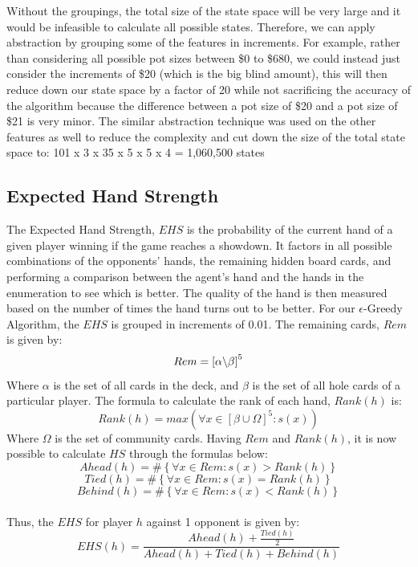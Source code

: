 \documentclass{article}
\begin{document}
Without the groupings, the total size of the state space will be very large and it would be infeasible to calculate all possible states. Therefore, we can apply abstraction by grouping some of the features in increments. For example, rather than considering all possible pot sizes between \$0 to \$680, we could instead just consider the increments of \$20 (which is the big blind amount), this will then reduce down our state space by a factor of 20 while not sacrificing the accuracy of the algorithm because the difference between a pot size of \$20 and a pot size of \$21 is very minor. The similar abstraction technique was used on the other features as well to reduce the complexity and cut down the size of the total state space to: 101 x 3 x 35 x 5 x 5 x 4 = 1,060,500 states

\subsection{Expected Hand Strength}

The Expected Hand Strength, $EHS$ is the probability of the current hand of a given player winning if the game reaches a showdown. It factors in all possible combinations of the opponents' hands, the remaining hidden board cards, and performing a comparison between the agent's hand and the hands in the enumeration to see which is better. The quality of the hand is then measured based on the number of times the hand turns out to be better. For our $\epsilon$-Greedy Algorithm, the $EHS$ is grouped in increments of 0.01. The remaining cards, $Rem$ is given by:
\begin{displaymath}
  Rem = \left[ \alpha \char`\\ \beta \right]^{5}
\end{displaymath}
Where $\alpha$ is the set of all cards in the deck, and $\beta$ is the set of all hole cards of a particular player. The formula to calculate the rank of each hand, $Rank(h)$ is:
\begin{displaymath}
  Rank(h) = max({\forall x \in [\beta \cup \Omega]^{5} : s(x)})
\end{displaymath}
Where $\Omega$ is the set of community cards.
Having $Rem$ and $Rank(h)$, it is now possible to calculate $HS$ through the formulas below:
\begin{displaymath}
  Ahead(h) = \# \left\lbrace \forall x \in Rem:s(x) > Rank(h) \right\rbrace
\end{displaymath}
\begin{displaymath}
  Tied(h) = \# \left\lbrace \forall x \in Rem:s(x) = Rank(h) \right\rbrace
\end{displaymath}
\begin{displaymath}
  Behind(h) = \# \left\lbrace \forall x \in Rem:s(x) < Rank(h) \right\rbrace
\end{displaymath}\\
Thus, the $EHS$ for player $h$ against 1 opponent is given by:
\begin{displaymath}
  EHS(h)= \frac{Ahead(h)+\frac{Tied(h)}{2}}{Ahead(h) + Tied(h) + Behind(h)}
\end{displaymath}
\end{document}
